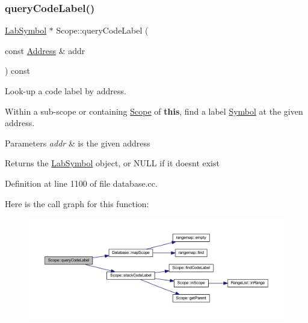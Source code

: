 \subsubsection{\texorpdfstring{queryCodeLabel()}{queryCodeLabel()}}
{\footnotesize\ttfamily \mbox{\hyperlink{class_lab_symbol}{Lab\+Symbol}} $\ast$ Scope\+::query\+Code\+Label (\begin{DoxyParamCaption}\item[{const \mbox{\hyperlink{class_address}{Address}} \&}]{addr }\end{DoxyParamCaption}) const}



Look-\/up a code label by address. 

Within a sub-\/scope or containing \mbox{\hyperlink{class_scope}{Scope}} of {\bfseries{this}}, find a label \mbox{\hyperlink{class_symbol}{Symbol}} at the given address. 
\begin{DoxyParams}{Parameters}
{\em addr} & is the given address \\
\hline
\end{DoxyParams}
\begin{DoxyReturn}{Returns}
the \mbox{\hyperlink{class_lab_symbol}{Lab\+Symbol}} object, or N\+U\+LL if it doesn\textquotesingle{}t exist 
\end{DoxyReturn}


Definition at line 1100 of file database.\+cc.

Here is the call graph for this function\+:
\nopagebreak
\begin{figure}[H]
\begin{center}
\leavevmode
\includegraphics[width=350pt]{class_scope_a88982df383433525505723b19b8aaa13_cgraph}
\end{center}
\end{figure}
\mbox{\label{class_scope_af50dcbdbad011571fc24398781a2bab2}} 
